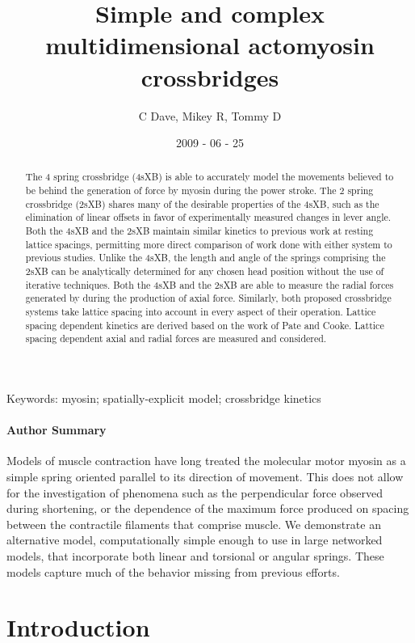\documentclass[]{article}
\title{Simple and complex multidimensional actomyosin crossbridges}
\author{C Dave, Mikey R, Tommy D}
\date{2009 - 06 - 25}
\begin{document}
\maketitle

\begin{abstract} 
The 4 spring crossbridge (4sXB) is able to accurately model the movements believed to be behind the generation of force by myosin during the power stroke.
The 2 spring crossbridge (2sXB) shares many of the desirable properties of the 4sXB, such as the elimination of linear offsets in favor of experimentally measured changes in lever angle.
Both the 4sXB and the 2sXB maintain similar kinetics to previous work at resting lattice spacings, permitting more direct comparison of work done with either system to previous studies.
Unlike the 4sXB, the length and angle of the springs comprising the 2sXB can be analytically determined for any chosen head position without the use of iterative techniques.
Both the 4sXB and the 2sXB are able to measure the radial forces generated by during the production of axial force.
Similarly, both proposed crossbridge systems take lattice spacing into account in every aspect of their operation.
Lattice spacing dependent kinetics are derived based on the work of Pate and Cooke.
Lattice spacing dependent axial and radial forces are measured and considered.
\end{abstract}

Keywords: myosin; spatially-explicit model; crossbridge kinetics

\paragraph*{Author Summary} %
Models of muscle contraction have long treated the molecular motor myosin as a simple spring oriented parallel to its direction of movement. 
This does not allow for the investigation of phenomena such as the perpendicular force observed during shortening, or the dependence of the maximum force produced on spacing between the contractile filaments that comprise muscle.
We demonstrate an alternative model, computationally simple enough to use in large networked models, that incorporate both linear and torsional or angular springs. These models capture much of the behavior missing from previous efforts.


\section{Introduction} %
\end{document}
